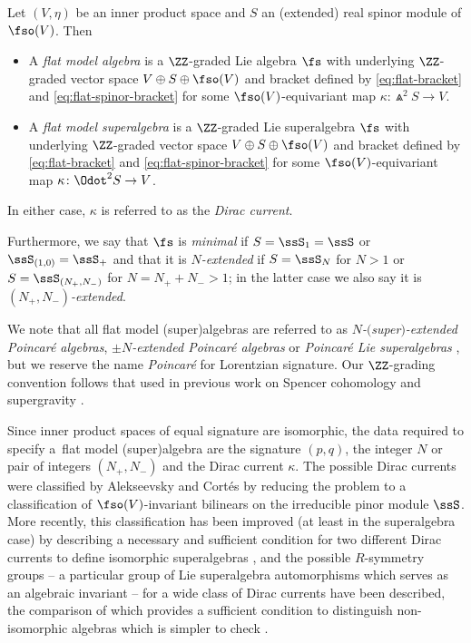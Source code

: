 \begin{Definition}\label{def:flat-model-alg}
	Let $(V,\eta)$ be an inner product space and $S$ an (extended) real spinor module of $\fso(V)$. Then
	\begin{itemize}\itemsep=0pt
		\item A \emph{flat model algebra} is a $\ZZ$-graded Lie algebra $\fs$ with underlying $\ZZ$-graded vector space $V\oplus S\oplus \fso(V)$ and bracket defined by \eqref{eq:flat-bracket} and \eqref{eq:flat-spinor-bracket} for some $\fso(V)$-equivariant map $\kappa\colon \Wedge^2 S\to V$.
		\item A \emph{flat model superalgebra} is a $\ZZ$-graded Lie superalgebra $\fs$ with underlying $\ZZ$-graded vector space $V\oplus S\oplus \fso(V)$ and bracket defined by \eqref{eq:flat-bracket} and \eqref{eq:flat-spinor-bracket} for some $\fso(V)$-equivariant map $\kappa\colon \Odot^2 S\to V$.
	\end{itemize}
	In either case, $\kappa$ is referred to as the \emph{Dirac current}.
	
	Furthermore, we say that $\fs$ is \emph{minimal} if $S=\ssS_1=\ssS$ or $\ssS_{(1,0)}=\ssS_+$ and that it is \emph{$N$-extended} if $S=\ssS_N$ for $N>1$ or $S=\ssS_{(N_+,N_-)}$ for $N=N_++N_->1$; in the latter case we also say it is \emph{$(N_+,N_-)$-extended}.
\end{Definition}

We note that all flat model (super)algebras are referred to as \emph{$N$-$($super$)$-extended Poincar\'e algebras}, \emph{$\pm N$-extended Poincar\'e algebras} \cite{Alekseevsky1997} or \emph{Poincar\'e Lie superalgebras} \cite{Cortes2020,Gall2021}, but we reserve the name \emph{Poincar\'e} for Lorentzian signature. Our $\ZZ$-grading convention follows that used in previous work on Spencer cohomology and supergravity \cite{Beckett2021,deMedeiros2016,deMedeiros2018,Figueroa-OFarrill2017_1,Figueroa-OFarrill2017}.

Since inner product spaces of equal signature are isomorphic, the data required to specify a~flat model (super)algebra are the signature $(p,q)$, the integer $N$ or pair of integers $(N_+,N_-)$ and the Dirac current $\kappa$. The possible Dirac currents were classified by Alekseevsky and Cort\'es \cite{Alekseevsky1997} by reducing the problem to a classification of $\fso(V)$-invariant bilinears on the irreducible pinor module $\ssS$. More recently, this classification has been improved (at least in the superalgebra case) by describing a necessary and sufficient condition for two different Dirac currents to define isomorphic superalgebras \cite{Cortes2020}, and the possible $R$-symmetry groups -- a particular group of Lie superalgebra automorphisms which serves as an algebraic invariant -- for a wide class of Dirac currents have been described, the comparison of which provides a sufficient condition to distinguish non-isomorphic algebras which is simpler to check \cite{Gall2021}.

